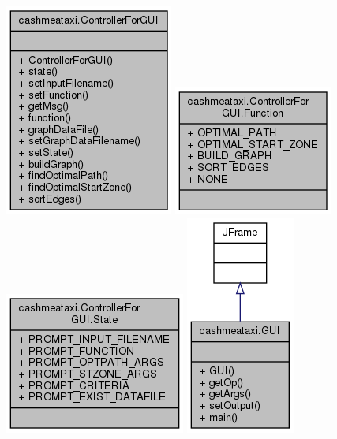 \documentclass[12pt]{article}
\begin{document}
\begin{center}
\includegraphics[scale = 0.6]{uml/classcashmeataxi_1_1ControllerForGUI__coll__graph.png} 
\includegraphics[scale = 0.6]{uml/enumcashmeataxi_1_1ControllerForGUI_1_1Function__coll__graph.png}
\includegraphics[scale = 0.6]{uml/enumcashmeataxi_1_1ControllerForGUI_1_1State__coll__graph.png}
\includegraphics[scale = 0.6]{uml/classcashmeataxi_1_1GUI__coll__graph.png} 
\end{center}
\end{document}

